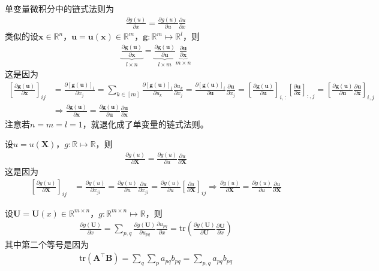 \documentclass{ctexart}
\newcommand{\blue}[1]{\textcolor{Solarized-blue}{#1}}
\theoremstyle{definition}
\def \gv {\bm{g}}
\def \uv {\bm{u}}
\def \xv {\bm{x}}
\def \Av {\mathbf{A}}
\def \Bv {\mathbf{B}}
\def \Uv {\mathbf{U}}
\def \Xv {\mathbf{X}}
\def \Rbb {\mathbb{R}}
\def \tr {\mathrm{tr}}
\begin{document}
单变量微积分中的\blue{链式法则}为
\begin{align*}
    \frac{\partial g(u)}{\partial x} = \frac{\partial g(u)}{\partial u} \frac{\partial u}{\partial x}
\end{align*}
类似的设$\xv \in \Rbb^n$，$\uv = \uv(\xv) \in \Rbb^m$，$\gv: \Rbb^m \mapsto \Rbb^l$，则
\begin{align*}
    \underbrace{\frac{\partial \gv(\uv)}{\partial \xv}}_{l \times n} = \underbrace{\frac{\partial \gv(\uv)}{\partial \uv}}_{l \times m} \underbrace{\frac{\partial \uv}{\partial \xv}}_{m \times n}
\end{align*}
这是因为
\begin{align*}
    \left[ \frac{\partial \gv(\uv)}{\partial \xv} \right]_{ij} & = \frac{\partial [\gv(\uv)]_i}{\partial x_j} = \sum_{k \in [m]} \frac{\partial [\gv(\uv)]_i}{\partial u_k} \frac{\partial u_k}{\partial x_j} = \frac{\partial [\gv(\uv)]_i}{\partial \uv} \frac{\partial \uv}{\partial x_j} = \left[ \frac{\partial \gv(\uv)}{\partial \uv} \right]_{i,:} \left[ \frac{\partial \uv}{\partial \xv} \right]_{:,j} = \left[ \frac{\partial \gv(\uv)}{\partial \uv} \frac{\partial \uv}{\partial \xv} \right]_{i,j} \\
                                                               & \Longrightarrow \frac{\partial \gv(\uv)}{\partial \xv} = \frac{\partial \gv(\uv)}{\partial \uv} \frac{\partial \uv}{\partial \xv}
\end{align*}
注意若$n = m = l = 1$，就退化成了单变量的链式法则。

设$u = u(\Xv)$，$g: \Rbb \mapsto \Rbb$，则
\begin{align*}
    \frac{\partial g(u)}{\partial \Xv} = \frac{\partial g(u)}{\partial u} \frac{\partial u}{\partial \Xv}
\end{align*}
这是因为
\begin{align*}
    \left[ \frac{\partial g(u)}{\partial \Xv} \right]_{ij} & = \frac{\partial g(u)}{\partial x_{ji}} = \frac{\partial g(u)}{\partial u} \frac{\partial u}{\partial x_{ji}} = \frac{\partial g(u)}{\partial u} \left[ \frac{\partial u}{\partial \Xv} \right]_{ij} \Longrightarrow \frac{\partial g(u)}{\partial \Xv} = \frac{\partial g(u)}{\partial u} \frac{\partial u}{\partial \Xv}
\end{align*}

设$\Uv = \Uv(x) \in \Rbb^{m \times n}$，$g: \Rbb^{m \times n} \mapsto \Rbb$，则
\begin{align*}
    \frac{\partial g(\Uv)}{\partial x} = \sum_{p,q} \frac{\partial g(\Uv)}{\partial u_{pq}} \frac{\partial u_{pq}}{\partial x} = \tr \left( \frac{\partial g(\Uv)}{\partial \Uv} \frac{\partial \Uv}{\partial x} \right)
\end{align*}
其中第二个等号是因为
\begin{align*}
    \tr(\Av^\top \Bv) = \sum_q \sum_p a_{pq} b_{pq} = \sum_{p,q} a_{pq} b_{pq}
\end{align*}
\end{document}
